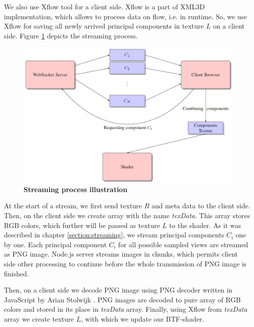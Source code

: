 We also use Xflow\cite{xflow} tool for a client side.
Xflow is a part of XML3D implementation, which allows to process data on flow, i.e. in runtime.
So, we use Xflow for saving all newly arrived principal components in texture $L$ on a client side. Figure \ref{fig:streaming} depicts the streaming process.

\begin{figure}[h]
 \centering
 \includegraphics[width=1.0\textwidth]{figures/streaming}
 \caption[Streaming process illustration ] {
 	{\bf Streaming process illustration}
	}
 \label{fig:streaming}
\end{figure}


At the start of a stream, we first send texture $R$ and meta data to the client side. 
Then, on the client side we create array with the name \emph{texData}. This array stores RGB colors, which further will be passed as texture $L$ to the shader.
As it was described in chapter \ref{section:streaming}, we stream principal components $C_{i}$ one by one.
Each principal component $C_{i}$ for all possible sampled views are streamed as PNG image. 
Node.js server streams images in chunks, which permits client side other processing to continue before the whole transmission of PNG image is finished.

Then, on a client side we decode PNG image using PNG decoder written in JavaScript by Arian Stolwijk \cite{pngreader}.
PNG images are decoded to pure array of RGB colors and stored in its place in \emph{texData} array. 
Finally, using Xflow from \emph{texData} array we create texture $L$, with which we update our BTF-shader.



\label{chapter:implementation}
